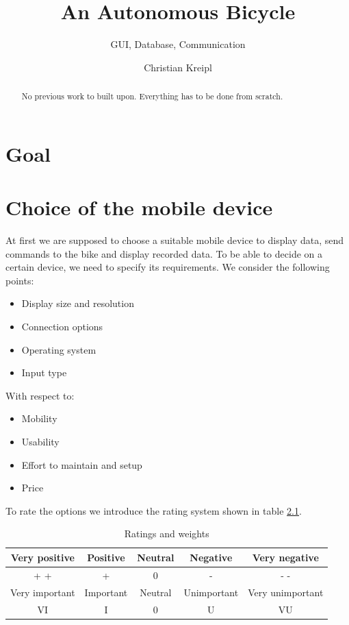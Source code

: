 \documentclass[]{scrreprt}
\title{An Autonomous Bicycle}
\subtitle{GUI, Database, Communication}
\author{Christian Kreipl}
\begin{document}
\maketitle

\begin{abstract}
	No previous work to built upon. Everything has to be done from scratch.
\end{abstract}

\tableofcontents

\chapter{Goal}
\chapter{Choice of the mobile device}
	At first we are supposed to choose a suitable mobile device to display data, send commands to the bike and display recorded data. To be able to decide on a certain device, we need to specify its requirements. We consider the following points:

	\begin{itemize}[noitemsep]
		\item{Display size and resolution}
		\item{Connection options}
		\item{Operating system}
		\item{Input type}
	\end{itemize}

	With respect to:
	\begin{itemize}[noitemsep]
		\item{Mobility}
		\item{Usability}
		\item{Effort to maintain and setup}
		\item{Price}
	\end{itemize}

	To rate the options we introduce the rating system shown in table \ref{tab:RAW}.
	\begin{table}[H]
		
		\centering
		\begin{tabular}{|c|c|c|c|c|}
			\hline 
			Very positive & Positive & Neutral & Negative & Very negative \\ 
			\hline 
			+ + & + & 0 & - & - - \\ 
			\hline \hline
			Very important & Important & Neutral & Unimportant & Very unimportant \\ 
			\hline 
			VI & I & 0 & U & VU \\ 
			\hline
		\end{tabular}
	\caption {Ratings and weights} \label{tab:RAW}
	\end{table}
\end{document}
